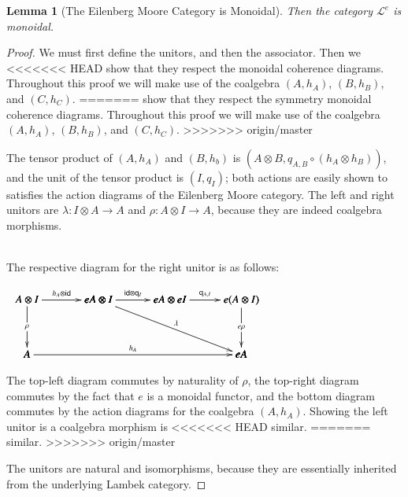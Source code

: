 \documentclass{article}
\newtheorem{lemma}[theorem]{Lemma}
\let\mto\to
\let\to\relax
\newcommand{\to}{\rightarrow}
\newcommand{\cat}[1]{\mathcal{#1}}
\newcommand{\id}[0]{\mathsf{id}}
\newcommand{\q}[1]{\mathsf{q}_{#1}}
\begin{document}
\begin{lemma}[The Eilenberg Moore Category is Monoidal]
  \label{lemma:the_eilenberg_moore_category_is_monoidal}
  Then the category $\cat{L}^e$ is monoidal.
\end{lemma}
\begin{proof}
  We must first define the unitors, and then the associator.  Then we
<<<<<<< HEAD
  show that they respect the monoidal coherence diagrams. Throughout this
  proof we will make use of the coalgebra $(A,h_A)$, $(B,h_B)$, and
  $(C,h_C)$.
=======
  show that they respect the symmetry monoidal coherence diagrams.
  Throughout this proof we will make use of the coalgebra $(A,h_A)$,
  $(B,h_B)$, and $(C,h_C)$.
>>>>>>> origin/master

  The tensor product of $(A, h_A)$ and $(B, h_b)$ is $(A \otimes
  B,q_{A,B} \circ (h_A \otimes h_B))$, and the unit of the tensor
  product is $(I, q_I)$; both actions are easily shown to satisfies
  the action diagrams of the Eilenberg Moore category. The left and
  right unitors are $\lambda : I \otimes A \mto A$ and $\rho : A
  \otimes I \mto A$, because they are indeed coalgebra morphisms.

  \ \\
  \noindent
  The respective diagram for the right unitor is as follows:
  \begin{center}
    \begin{math}
      \begin{array}{lll}
        \bfig
        \square|amma|/->`->``/<650,500>[A \otimes I`eA \otimes I`A`;h_A \otimes \id{}`\rho``]
        \morphism(650,500)<650,0>[eA \otimes I`eA \otimes eI;\id{} \otimes \q{I}]
        \square(1300,0)|amma|/->``->`/<650,500>[eA \otimes eI`e(A \otimes I)``eA;\q{A,I}``e\rho`]

        \morphism(650,500)<1300,-500>[eA \otimes I`eA;\lambda]
        \morphism<1950,0>[A`eA;h_A]
        \efig
      \end{array}
    \end{math}
  \end{center}
  The top-left diagram commutes by naturality of $\rho$, the top-right
  diagram commutes by the fact that $e$ is a monoidal functor, and the
  bottom diagram commutes by the action diagrams for the coalgebra
  $(A,h_A)$. Showing the left unitor is a coalgebra morphism is
<<<<<<< HEAD
  similar. 
=======
  similar.
>>>>>>> origin/master

  The unitors are natural and isomorphisms, because they are
  essentially inherited from the underlying Lambek category.


\end{proof}
\end{document}
